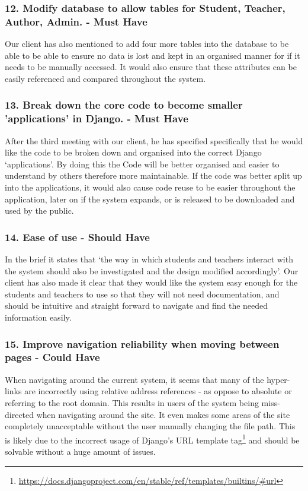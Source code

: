 	\subsubsection*{12. Modify database to allow tables for Student, Teacher, Author, Admin. - Must Have}
	Our client has also mentioned to add four more tables into the database to be able to be able to ensure no data is lost and kept in an organised manner for if it needs to be manually accessed. It would also ensure that these attributes can be easily referenced and compared throughout the system.
	
	\subsubsection*{13. Break down the core code to become smaller 'applications' in Django. - Must Have}
	After the third meeting with our client, he has specified specifically that he would like the code to be broken down and organised into the correct Django ‘applications’. By doing this the Code will be better organised and easier to understand by others therefore more maintainable. If the code was better split up into the applications, it would also cause code reuse to be easier throughout the application, later on if the system expands, or is released to be downloaded and used by the public.
	\subsubsection*{14. Ease of use - Should Have}
	In the brief it states that ‘the way in which students and teachers interact with the system should also be investigated and the design modified accordingly’. Our client has also made it clear that they would like the system easy enough for the students and teachers to use so that they will not need documentation, and should be intuitive and straight forward to navigate and find the needed information easily.
	\subsubsection*{15. Improve navigation reliability when moving between pages - Could Have}
	When navigating around the current system, it seems that many of the hyper-links are incorrectly using relative address references - as oppose to absolute or referring to the root domain. This results in users of the system being miss-directed when navigating around the site. It even makes some areas of the site completely unacceptable without the user manually changing the file path.  This is likely due to the incorrect usage of Django's URL template tag\footnote{\url{https://docs.djangoproject.com/en/stable/ref/templates/builtins/#url}} and should be solvable without a huge amount of issues.
